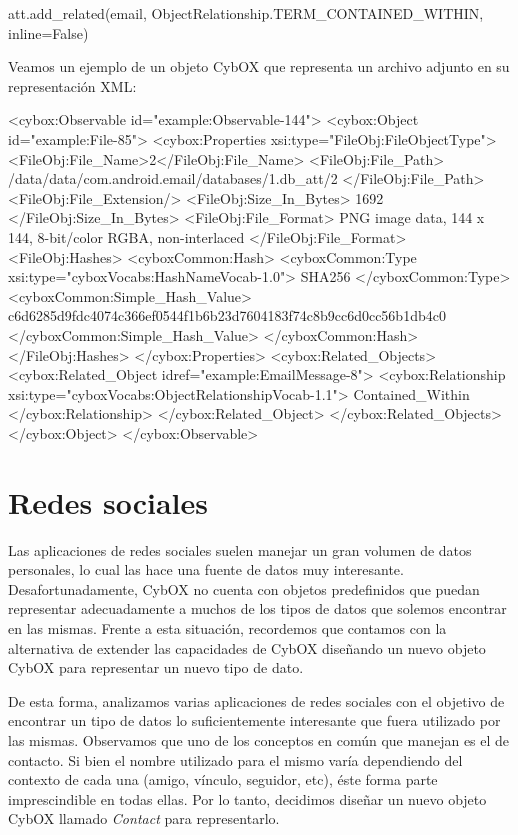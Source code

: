 \begin{python}
att.add_related(email,
             ObjectRelationship.TERM_CONTAINED_WITHIN, 
             inline=False)
\end{python}

Veamos un ejemplo de un objeto CybOX que representa un archivo adjunto en su representación XML:
\newline

\begin{xml}
<cybox:Observable id="example:Observable-144">
  <cybox:Object id="example:File-85">
    <cybox:Properties xsi:type="FileObj:FileObjectType">
      <FileObj:File_Name>2</FileObj:File_Name>
      <FileObj:File_Path>
/data/data/com.android.email/databases/1.db_att/2
      </FileObj:File_Path>
      <FileObj:File_Extension/>
      <FileObj:Size_In_Bytes>
        1692
      </FileObj:Size_In_Bytes>
      <FileObj:File_Format>
        PNG image data, 144 x 144, 
        8-bit/color RGBA, non-interlaced
      </FileObj:File_Format>
      <FileObj:Hashes>
        <cyboxCommon:Hash>
          <cyboxCommon:Type xsi:type="cyboxVocabs:HashNameVocab-1.0">
            SHA256
          </cyboxCommon:Type>
          <cyboxCommon:Simple_Hash_Value>
c6d6285d9fdc4074c366ef0544f1b6b23d7604183f74c8b9cc6d0cc56b1db4c0
          </cyboxCommon:Simple_Hash_Value>
        </cyboxCommon:Hash>
      </FileObj:Hashes>
    </cybox:Properties>
    <cybox:Related_Objects>
      <cybox:Related_Object idref="example:EmailMessage-8">
        <cybox:Relationship xsi:type="cyboxVocabs:ObjectRelationshipVocab-1.1">
          Contained_Within
        </cybox:Relationship>
      </cybox:Related_Object>
    </cybox:Related_Objects>
  </cybox:Object>
</cybox:Observable>
\end{xml}

\section{Redes sociales}
Las aplicaciones de redes sociales suelen manejar un gran volumen de datos personales, lo cual las hace una fuente de datos muy interesante. Desafortunadamente, CybOX no cuenta con objetos predefinidos que puedan representar adecuadamente a muchos de los tipos de datos que solemos encontrar en las mismas. Frente a esta situación, recordemos que contamos con la alternativa de extender las capacidades de CybOX diseñando un nuevo objeto CybOX para representar un nuevo tipo de dato.

De esta forma, analizamos varias aplicaciones de redes sociales con el objetivo de encontrar un tipo de datos lo suficientemente interesante que fuera utilizado por las mismas. Observamos que uno de los conceptos en común que manejan es el de contacto. Si bien el nombre utilizado para el mismo varía dependiendo del contexto de cada una (amigo, vínculo, seguidor, etc), éste forma parte imprescindible en todas ellas. Por lo tanto, decidimos diseñar un nuevo objeto CybOX llamado \emph{Contact} para representarlo.

